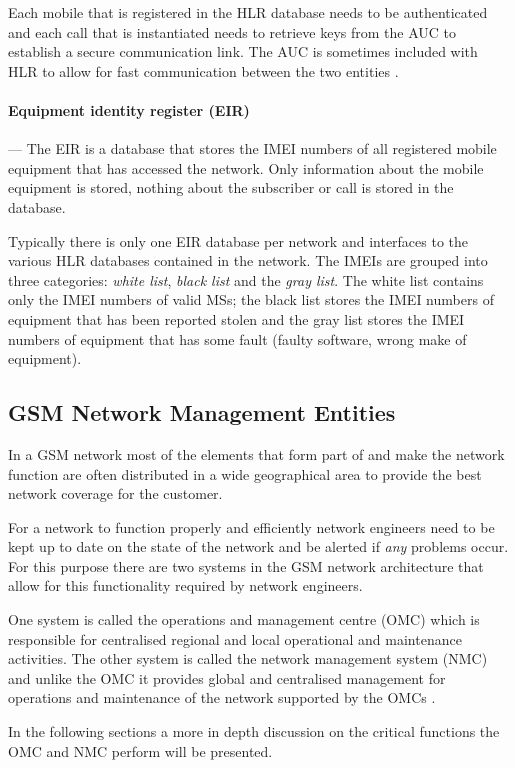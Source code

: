 Each mobile that is registered in the HLR database needs to be authenticated and each call that is instantiated needs to retrieve keys from the AUC to establish a secure communication link\cite{GSM92,GSMSysEngin}. The AUC is sometimes included with HLR to allow for fast communication between the two entities \cite{GSMSysEngin}.

\paragraph{Equipment identity register (EIR)}
--- The EIR is a database that stores the IMEI numbers of all registered mobile equipment that has accessed the network. Only information about the mobile equipment is stored, nothing about the subscriber or call is stored in the database.

Typically there is only one EIR database per network and interfaces to the various HLR databases contained in the network. The IMEIs are grouped into three categories: \emph{white list}, \emph{black list} and the \emph{gray list}. The white list contains only the IMEI numbers of valid MSs; the black list stores the IMEI numbers of equipment that has been reported stolen and the gray list stores the IMEI numbers of equipment that has some fault (faulty software, wrong make of equipment).

\subsection{GSM Network Management Entities}
In a GSM network most of the elements that form part of and make the network function are often distributed in a wide geographical area to provide the best network coverage for the customer. 

For a network to function properly and efficiently network engineers need to be kept up to date on the state of the network and be alerted if \emph{any} problems occur. For this purpose there are two systems in the GSM network architecture that allow for this functionality required by network engineers. 

One system is called the operations and management centre (OMC) which is responsible for centralised regional and local operational and maintenance activities. The other system is called the network management system (NMC) and unlike the OMC it provides global and centralised management for operations and maintenance of the network supported by the OMCs \cite{GSMSysEngin}.

In the following sections a more in depth discussion on the critical functions the OMC and NMC perform will be presented.

